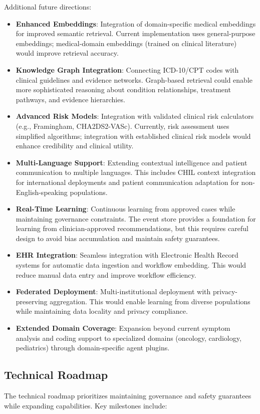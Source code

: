 \documentclass[conference]{IEEEtran}
\begin{document}
Additional future directions:
\begin{itemize}
    \item \textbf{Enhanced Embeddings}: Integration of domain-specific medical embeddings for improved semantic retrieval. Current implementation uses general-purpose embeddings; medical-domain embeddings (trained on clinical literature) would improve retrieval accuracy.
    \item \textbf{Knowledge Graph Integration}: Connecting ICD-10/CPT codes with clinical guidelines and evidence networks. Graph-based retrieval could enable more sophisticated reasoning about condition relationships, treatment pathways, and evidence hierarchies.
    \item \textbf{Advanced Risk Models}: Integration with validated clinical risk calculators (e.g., Framingham, CHA2DS2-VASc). Currently, risk assessment uses simplified algorithms; integration with established clinical risk models would enhance credibility and clinical utility.
    \item \textbf{Multi-Language Support}: Extending contextual intelligence and patient communication to multiple languages. This includes CHIL context integration for international deployments and patient communication adaptation for non-English-speaking populations.
    \item \textbf{Real-Time Learning}: Continuous learning from approved cases while maintaining governance constraints. The event store provides a foundation for learning from clinician-approved recommendations, but this requires careful design to avoid bias accumulation and maintain safety guarantees.
    \item \textbf{EHR Integration}: Seamless integration with Electronic Health Record systems for automatic data ingestion and workflow embedding. This would reduce manual data entry and improve workflow efficiency.
    \item \textbf{Federated Deployment}: Multi-institutional deployment with privacy-preserving aggregation. This would enable learning from diverse populations while maintaining data locality and privacy compliance.
    \item \textbf{Extended Domain Coverage}: Expansion beyond current symptom analysis and coding support to specialized domains (oncology, cardiology, pediatrics) through domain-specific agent plugins.
\end{itemize}

\subsection{Technical Roadmap}
The technical roadmap prioritizes maintaining governance and safety guarantees while expanding capabilities. Key milestones include:
\end{document}
